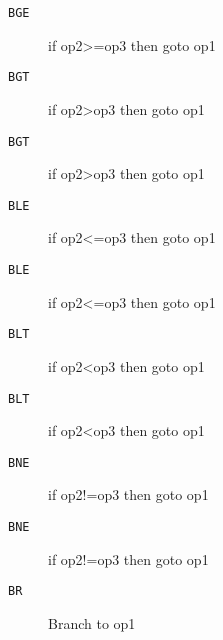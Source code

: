 \begin{description}
\item[\texttt{BGE}]  if op2>=op3 then goto op1\\

\end{description}
\begin{description}
\item[\texttt{BGT}]  if op2>op3 then goto op1\\

\end{description}
\begin{description}
\item[\texttt{BGT}]  if op2>op3 then goto op1\\

\end{description}
\begin{description}
\item[\texttt{BLE}]  if op2<=op3 then goto op1\\

\end{description}
\begin{description}
\item[\texttt{BLE}]  if op2<=op3 then goto op1\\

\end{description}
\begin{description}
\item[\texttt{BLT}]  if op2<op3 then goto op1\\

\end{description}
\begin{description}
\item[\texttt{BLT}]  if op2<op3 then goto op1\\

\end{description}
\begin{description}
\item[\texttt{BNE}]  if op2!=op3 then goto op1\\

\end{description}
\begin{description}
\item[\texttt{BNE}]  if op2!=op3 then goto op1\\

\end{description}
\begin{description}
\item[\texttt{BR}]  Branch to op1\\

\end{description}
